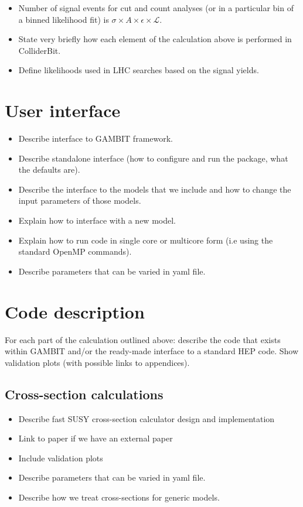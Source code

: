 \documentclass[11pt,a4paper]{article}
\begin{document}
\begin{itemize}
\item Number of signal events for cut and count analyses (or in a particular bin of a binned likelihood fit) is $\sigma \times A \times \epsilon \times \mathcal{L}$.
\item State very briefly how each element of the calculation above is performed in ColliderBit.
\item Define likelihoods used in LHC searches based on the signal yields.
\end{itemize}

\section{User interface}

\begin{itemize}
\item Describe interface to GAMBIT framework.
\item Describe standalone interface (how to configure and run the package, what the defaults are).
\item Describe the interface to the models that we include and how to change the input parameters of those models.
\item Explain how to interface with a new model.
\item Explain how to run code in single core or multicore form (i.e using the standard OpenMP commands).
\item Describe parameters that can be varied in yaml file.
\end{itemize}

\section{Code description}

For each part of the calculation outlined above: describe the code that exists within GAMBIT and/or the ready-made interface to a standard HEP code. Show validation plots (with possible links to appendices).

\subsection{Cross-section calculations}

\begin{itemize}
\item Describe fast SUSY cross-section calculator design and implementation
\item Link to paper if we have an external paper
\item Include validation plots
\item Describe parameters that can be varied in yaml file.
\item Describe how we treat cross-sections for generic models.
\end{itemize}
\end{document}
